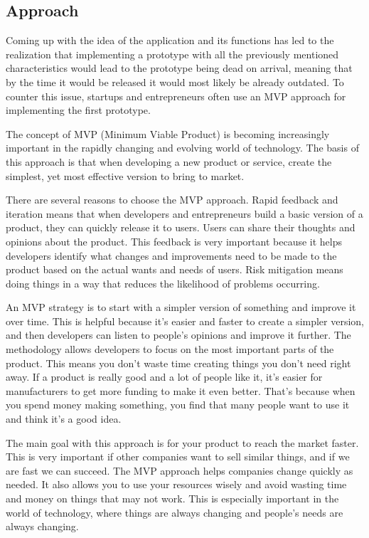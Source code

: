 \subsection{Approach}

Coming up with the idea of the application and its functions has led to the realization that implementing a prototype with all the previously mentioned characteristics would lead to the prototype being dead on arrival, meaning that by the time it would be released it would most likely be already outdated. To counter this issue, startups and entrepreneurs often use an MVP approach for implementing the first prototype. 

The concept of MVP (Minimum Viable Product) is becoming increasingly important in the rapidly changing and evolving world of technology. The basis of this approach is that when developing a new product or service,  create  the simplest, yet most effective version to bring to market. 

There are several reasons to choose the MVP approach.
Rapid feedback and iteration means that when developers and entrepreneurs build a basic version of a product, they can quickly release it to users. Users can  share their thoughts and opinions about the product. This feedback is very important because it helps developers identify what changes and improvements need to be made to the product based on the actual wants and needs of users. Risk mitigation means doing things in a way that reduces the likelihood of problems occurring. 
 
An MVP strategy is to start with a simpler version of something and improve it  over time. This is helpful because it's easier and faster to create a simpler version, and then  developers can listen to people's opinions and improve it further. The methodology allows developers to focus on the most important parts of the product. This means you don't waste time creating things you don't need right away. If a product is really good and a lot of people like it, it's easier for manufacturers to get more funding to make it even better. That's because when you spend money making something, you find that many people want to use it and think it's a good idea. 
 
The main goal with this approach is for your product to reach the market faster. This is very important if other companies want to sell similar things, and if we are fast we can succeed. The MVP approach helps companies change quickly as needed. It also allows you to use your resources wisely and avoid wasting time and money on things that may not work. This is especially important in the world of technology, where things are always changing and people's needs are always changing. \cite{mvp}

